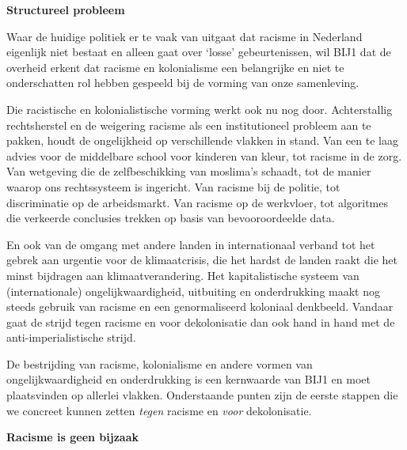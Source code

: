 \textbf{Structureel probleem}

Waar de huidige politiek er te vaak van uitgaat dat racisme in Nederland
eigenlijk niet bestaat en alleen gaat over `losse' gebeurtenissen, wil
BIJ1 dat de overheid erkent dat racisme en kolonialisme een belangrijke
en niet te onderschatten rol hebben gespeeld bij de vorming van onze
samenleving.

Die racistische en kolonialistische vorming werkt ook nu nog door.
Achterstallig rechtsherstel en de weigering racisme als een
institutioneel probleem aan te pakken, houdt de ongelijkheid op
verschillende vlakken in stand. Van een te laag advies voor de
middelbare school voor kinderen van kleur, tot racisme in de zorg. Van
wetgeving die de zelfbeschikking van moslima's schaadt, tot de manier
waarop ons rechtssysteem is ingericht. Van racisme bij de politie, tot
discriminatie op de arbeidsmarkt. Van racisme op de werkvloer, tot
algoritmes die verkeerde conclusies trekken op basis van bevooroordeelde
data.

En ook van de omgang met andere landen in internationaal verband tot het
gebrek aan urgentie voor de klimaatcrisis, die het hardst de landen
raakt die het minst bijdragen aan klimaatverandering. Het
kapitalistische systeem van (internationale) ongelijkwaardigheid,
uitbuiting en onderdrukking maakt nog steeds gebruik van racisme en een
genormaliseerd koloniaal denkbeeld. Vandaar gaat de strijd tegen racisme
en voor dekolonisatie dan ook hand in hand met de anti-imperialistische
strijd.

De bestrijding van racisme, kolonialisme en andere vormen van
ongelijkwaardigheid en onderdrukking is een kernwaarde van BIJ1 en moet
plaatsvinden op allerlei vlakken. Onderstaande punten zijn de eerste
stappen die we concreet kunnen zetten \emph{tegen} racisme en
\emph{voor} dekolonisatie.

\textbf{Racisme is geen bijzaak}

